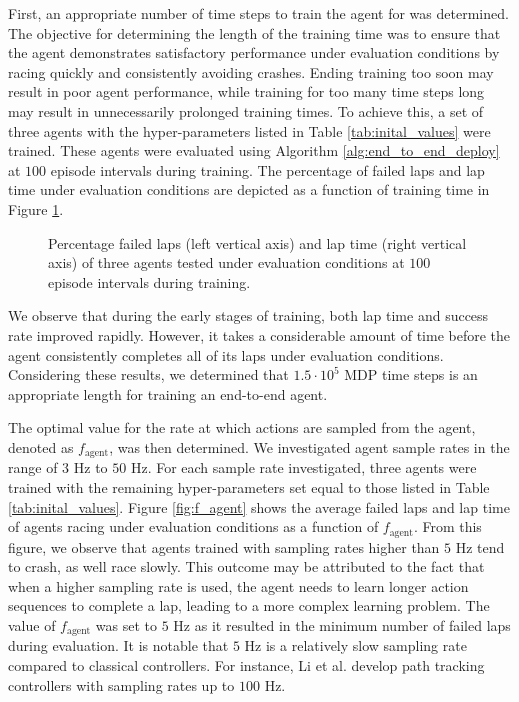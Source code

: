 First, an appropriate number of time steps to train the agent for was determined.
The objective for determining the length of the training time was to ensure that the agent demonstrates satisfactory performance under evaluation conditions by racing quickly and consistently avoiding crashes. 
Ending training too soon may result in poor agent performance, while training for too many time steps long may result in unnecessarily prolonged training times. 
To achieve this, a set of three agents with the hyper-parameters listed in Table \ref{tab:inital_values} were trained.
These agents were evaluated using Algorithm \ref{alg:end_to_end_deploy} at $100$ episode intervals during training.
The percentage of failed laps and lap time under evaluation conditions are depicted as a function of training time in Figure \ref{fig:MDP_steps}. 

\begin{figure}[htb!]
    \centering
    
    \caption[Percentage failed laps and lap time of an end-to-end agent during training]{Percentage failed laps (left vertical axis) and lap time (right vertical axis) of three agents tested under evaluation conditions at $100$ episode intervals during training.}
    \label{fig:MDP_steps}
\end{figure}

We observe that during the early stages of training, both lap time and success rate improved rapidly. 
However, it takes a considerable amount of time before the agent consistently completes all of its laps under evaluation conditions. 
Considering these results, we determined that $1.5\cdot10^{5}$ MDP time steps is an appropriate length for training an end-to-end agent.



The optimal value for the rate at which actions are sampled from the agent, denoted as $f_{\text{agent}}$, was then determined.
We investigated agent sample rates in the range of $3$ Hz to $50$ Hz.
For each sample rate investigated, three agents were trained with the remaining hyper-parameters set equal to those listed in Table \ref{tab:inital_values}.
Figure \ref{fig:f_agent} shows the average failed laps and lap time of agents racing under evaluation conditions as a function of $f_{\text{agent}}$.  
From this figure, we observe that agents trained with sampling rates higher than $5$ Hz tend to crash, as well race slowly.
This outcome may be attributed to the fact that when a higher sampling rate is used, the agent needs to learn longer action sequences to complete a lap, leading to a more complex learning problem. 
The value of $f_{\text{agent}}$ was set to $5$ Hz as it resulted in the minimum number of failed laps during evaluation.
It is notable that $5$ Hz is a relatively slow sampling rate compared to classical controllers.
For instance, Li et al. \cite{Li2019} develop path tracking controllers with sampling rates up to $100$ Hz.

